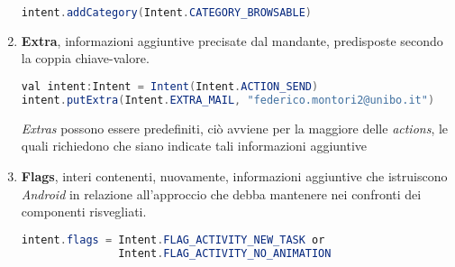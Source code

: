 \documentclass{article}
\begin{document}
\begin{enumerate}
    \begin{lstlisting}[language=JAVA, title=Definizone del field category]
intent.addCategory(Intent.CATEGORY_BROWSABLE)
    \end{lstlisting}
    \item \textbf{Extra}, informazioni aggiuntive precisate dal mandante, predisposte secondo la coppia chiave-valore.
    \begin{lstlisting}[language=JAVA, title=Definizone del field extra]
val intent:Intent = Intent(Intent.ACTION_SEND)
intent.putExtra(Intent.EXTRA_MAIL, "federico.montori2@unibo.it")
    \end{lstlisting}
    \textit{Extras} possono essere predefiniti, ciò avviene per la maggiore delle \textit{actions}, le quali richiedono che siano indicate tali informazioni aggiuntive
    \item  \textbf{Flags}, interi contenenti, nuovamente, informazioni aggiuntive che istruiscono \textit{Android} in relazione all'approccio che debba mantenere nei confronti dei componenti risvegliati.
    \begin{lstlisting}[language=JAVA, title=Definizione del field flags]
intent.flags = Intent.FLAG_ACTIVITY_NEW_TASK or
               Intent.FLAG_ACTIVITY_NO_ANIMATION
    \end{lstlisting}
\end{enumerate}
\end{document}
